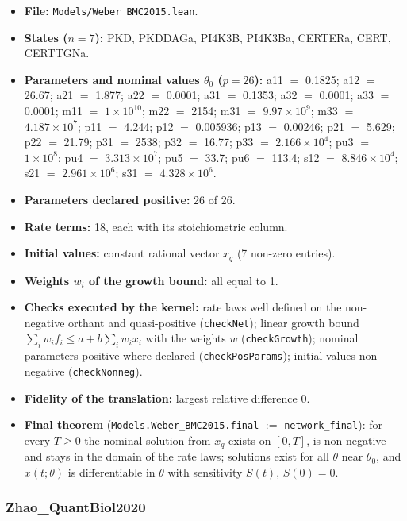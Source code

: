 \begin{itemize}\itemsep0pt\small
\item \textbf{File:} \texttt{Models/Weber\_BMC2015.lean}.
\item \textbf{States ($n=7$):} PKD, PKDDAGa, PI4K3B, PI4K3Ba, CERTERa, CERT, CERTTGNa.
\item \textbf{Parameters and nominal values $\theta_0$ ($p=26$):} a11 $=$ 0.1825; a12 $=$ 26.67; a21 $=$ 1.877; a22 $=$ 0.0001; a31 $=$ 0.1353; a32 $=$ 0.0001; a33 $=$ 0.0001; m11 $=$ $1\times10^{10}$; m22 $=$ 2154; m31 $=$ $9.97\times10^{9}$; m33 $=$ $4.187\times10^{7}$; p11 $=$ 4.244; p12 $=$ 0.005936; p13 $=$ 0.00246; p21 $=$ 5.629; p22 $=$ 21.79; p31 $=$ 2538; p32 $=$ 16.77; p33 $=$ $2.166\times10^{4}$; pu3 $=$ $1\times10^{8}$; pu4 $=$ $3.313\times10^{7}$; pu5 $=$ 33.7; pu6 $=$ 113.4; s12 $=$ $8.846\times10^{4}$; s21 $=$ $2.961\times10^{6}$; s31 $=$ $4.328\times10^{6}$.
\item \textbf{Parameters declared positive:} 26 of 26.
\item \textbf{Rate terms:} 18, each with its stoichiometric column.
\item \textbf{Initial values:} constant rational vector $x_q$ (7 non-zero entries).
\item \textbf{Weights $w_i$ of the growth bound:} all equal to 1.
\item \textbf{Checks executed by the kernel:} rate laws well defined on the non-negative orthant and quasi-positive (\texttt{checkNet}); linear growth bound $\sum_iw_if_i\le a+b\sum_iw_ix_i$ with the weights $w$ (\texttt{checkGrowth}); nominal parameters positive where declared (\texttt{checkPosParams}); initial values non-negative (\texttt{checkNonneg}).
\item \textbf{Fidelity of the translation:} largest relative difference 0.
\item \textbf{Final theorem} (\texttt{Models.Weber\_BMC2015.final} $:=$ \texttt{network\_final}): for every $T\ge0$ the nominal solution from $x_q$ exists on $[0,T]$, is non-negative and stays in the domain of the rate laws; solutions exist for all $\theta$ near $\theta_0$, and $x(t;\theta)$ is differentiable in $\theta$ with sensitivity $S(t)$, $S(0)=0$.
\end{itemize}

\subsubsection*{Zhao\_QuantBiol2020}


